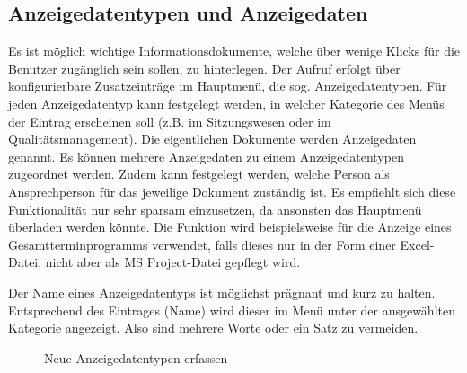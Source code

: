 \subsection{Anzeigedatentypen und Anzeigedaten}

Es ist möglich wichtige Informationsdokumente, welche über wenige Klicks für die Benutzer zugänglich sein sollen, zu hinterlegen. Der Aufruf erfolgt über konfigurierbare Zusatzeinträge im Hauptmenü, die sog. Anzeigedatentypen. Für jeden Anzeigedatentyp kann festgelegt werden, in welcher Kategorie des Menüs der Eintrag erscheinen soll (z.B. im Sitzungswesen oder im Qualitätsmanagement). Die eigentlichen Dokumente werden Anzeigedaten genannt. Es können mehrere Anzeigedaten zu einem Anzeigedatentypen zugeordnet werden. Zudem kann festgelegt werden, welche Person als Ansprechperson für das jeweilige Dokument zuständig ist. Es empfiehlt sich diese Funktionalität nur sehr sparsam einzusetzen, da ansonsten das Hauptmenü überladen werden könnte. Die Funktion wird beispielsweise für die Anzeige eines Gesamtterminprogramms verwendet, falls dieses nur in der Form einer Excel-Datei, nicht aber als MS Project-Datei gepflegt wird.

\vspace{\baselineskip}

Der Name eines Anzeigedatentyps ist möglichst prägnant und kurz zu halten. Entsprechend des Eintrages (Name) wird dieser im Menü unter der ausgewählten Kategorie angezeigt. Also sind mehrere Worte oder ein Satz zu vermeiden.

\begin{figure}[H]
\caption{Neue Anzeigedatentypen erfassen}
\end{figure}

